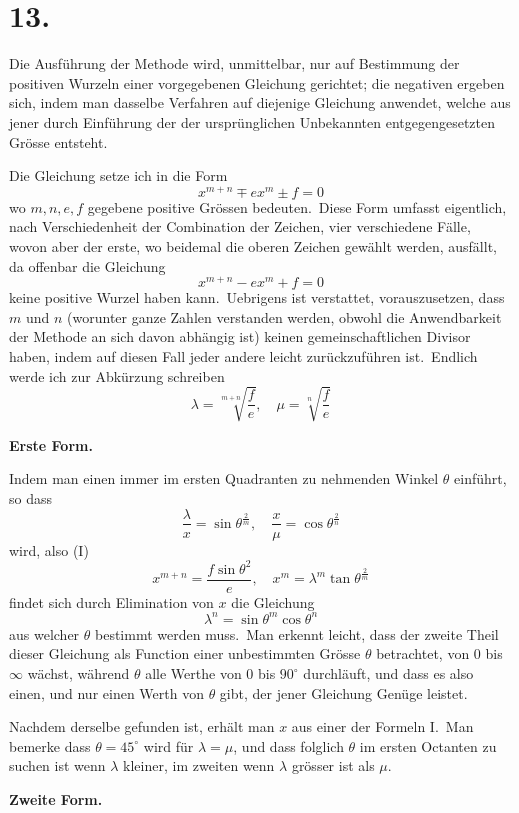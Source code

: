 \documentclass[12pt,a4paper]{article}
\theoremstyle{plain}
\begin{document}
\section*{13.}

Die Ausführung der Methode wird, unmittelbar, nur auf Bestimmung der
positiven Wurzeln einer vorgegebenen Gleichung gerichtet; die negativen ergeben
sich, indem man dasselbe Verfahren auf diejenige Gleichung anwendet, welche
aus jener durch Einführung der der ursprünglichen Unbekannten entgegengesetzten Grösse entsteht.

Die Gleichung setze ich in die Form
\[
x^{m+n} \mp e x^m \pm f = 0
\]
wo $m, n, e, f$ gegebene positive Grössen bedeuten.\ Diese Form umfasst eigentlich, nach Verschiedenheit der Combination der Zeichen, vier verschiedene Fälle,
wovon aber der erste, wo beidemal die oberen Zeichen gewählt werden, ausfällt,
da offenbar die Gleichung
\[
x^{m+n} - e x^m + f = 0
\]
keine positive Wurzel haben kann.\ Uebrigens ist verstattet, vorauszusetzen, dass
$m$ und $n$ (worunter ganze Zahlen verstanden werden, obwohl die Anwendbarkeit
der Methode an sich davon abhängig ist) keinen gemeinschaftlichen Divisor haben, indem auf diesen Fall jeder andere leicht zurückzuführen ist.\ Endlich werde
ich zur Abkürzung schreiben
\[
\lambda = \sqrt[m+n]{\frac{f}{e}}, \quad \mu = \sqrt[n]{\frac{f}{e}}
\]

\textbf{Erste Form.}

Indem man einen immer im ersten Quadranten zu nehmenden Winkel
$\theta$ einführt, so dass
\[
\frac{\lambda}{x} = \sin\theta^{\frac{2}{m}}, \quad \frac{x}{\mu} = \cos\theta^{\frac{2}{n}}
\]
wird, also (I)
\[
x^{m+n} = \frac{f \sin\theta^2}{e}, \quad x^m = \lambda^m \tan\theta^{\frac{2}{m}}
\]
findet sich durch Elimination von $x$ die Gleichung
\[
\lambda^n = \sin\theta^m \cos\theta^n
\]
aus welcher $\theta$ bestimmt werden muss.\ Man erkennt leicht, dass der zweite Theil
dieser Gleichung als Function einer unbestimmten Grösse $\theta$ betrachtet, von $0$
bis $\infty$ wächst, während $\theta$ alle Werthe von $0$ bis $90^\circ$ durchläuft, und dass es
also einen, und nur einen Werth von $\theta$ gibt, der jener Gleichung Genüge leistet.

Nachdem derselbe gefunden ist, erhält man $x$ aus einer der Formeln I.\ Man bemerke dass $\theta = 45^\circ$ wird für $\lambda = \mu$, und dass folglich $\theta$ im ersten Octanten
zu suchen ist wenn $\lambda$ kleiner, im zweiten wenn $\lambda$ grösser ist als $\mu$.

\textbf{Zweite Form.}
\end{document}
